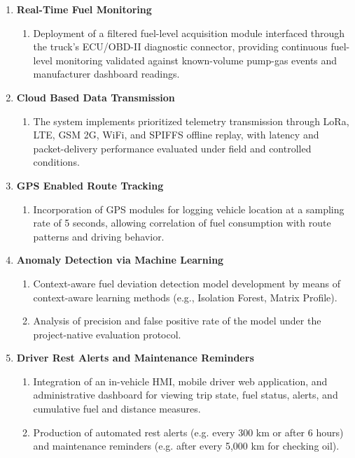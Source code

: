 \begin{enumerate}
    \item \textbf{Real-Time Fuel Monitoring}
    \begin{enumerate}
        \item Deployment of a filtered fuel-level acquisition module interfaced through the truck's ECU/OBD-II diagnostic connector, providing continuous fuel-level monitoring validated against known-volume pump-gas events and manufacturer dashboard readings.
    \end{enumerate}
	
	\item \textbf{Cloud Based Data Transmission}
    \begin{enumerate}
        \item The system implements prioritized telemetry transmission through LoRa, LTE, GSM 2G, WiFi, and SPIFFS offline replay, with latency and packet-delivery performance evaluated under field and controlled conditions.
    \end{enumerate}

    \item \textbf{GPS Enabled Route Tracking}
    \begin{enumerate}
        \item Incorporation of GPS modules for logging vehicle location at a sampling rate of 5 seconds, allowing correlation of fuel consumption with route patterns and driving behavior.
     \end{enumerate}

    \item \textbf{Anomaly Detection via Machine Learning}
    \begin{enumerate}
        \item Context-aware fuel deviation detection model development by means of context-aware learning methods (e.g., Isolation Forest, Matrix Profile). 
        \item Analysis of precision and false positive rate of the model under the project-native evaluation protocol.
    \end{enumerate}

    \item \textbf{Driver Rest Alerts and Maintenance Reminders}
    \begin{enumerate}
        \item Integration of an in-vehicle HMI, mobile driver web application, and administrative dashboard for viewing trip state, fuel status, alerts, and cumulative fuel and distance measures.
        \item Production of automated rest alerts (e.g. every 300 km or after 6 hours) and maintenance reminders (e.g. after every 5,000 km for checking oil).
    \end{enumerate}
\end{enumerate}

